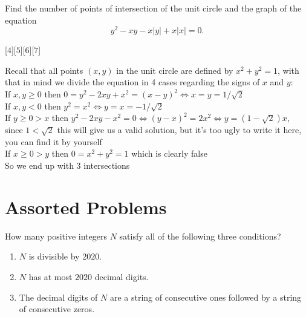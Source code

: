 \begin{problem}
    Find the number of points of intersection of the unit circle and the graph of the equation\\
    $$y^2 - xy - x|y| + x|x| = 0.$$
\end{problem}

[$4$][$5$][$6$][$7$]

\begin{solution}[A]
    Recall that all points $(x,y)$ in the unit circle are defined by $x^2+y^2=1$, with that in mind we divide the equation in 4 cases regarding the signs of $x$ and $y$:\\
    If $x,y \geq 0$ then $0=y^2-2xy+x^2=(x-y)^2 \iff x=y=1/\sqrt2$\\
    If $x,y < 0$ then $y^2=x^2 \iff y=x=-1/ \sqrt2$\\
    If $y \geq 0 >x$ then $y^2-2xy-x^2=0 \iff (y-x)^2=2x^2 \iff y=(1-\sqrt2)x$, since $1<\sqrt2$ this will give us a valid solution, but it's too ugly to write it here, you can find it by yourself\\
    If $x \geq 0 > y$ then $0=x^2+y^2=1$ which is clearly false\\
    So we end up with $\boxed{3}$ intersections
\end{solution}

\section*{Assorted Problems}\vspace{-15pt}

\begin{problem}[N][6][Putnam 2020-A1]
    How many positive integers \( N \) satisfy all of the following three conditions?
    \begin{enumerate}[label=(\roman*), topsep=1mm]
        \item \( N \) is divisible by \( 2020 \).
        \item \( N \) has at most \( 2020 \) decimal digits.
        \item The decimal digits of \( N \) are a string of consecutive ones followed by a string of consecutive zeros.
    \end{enumerate}%
\end{problem}

